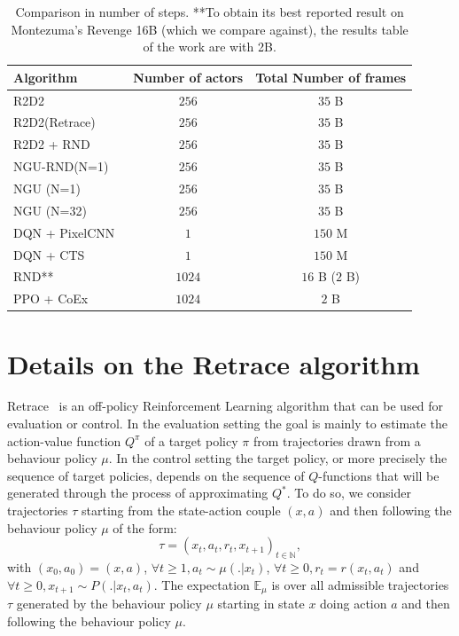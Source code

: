 \documentclass{article} %
\begin{document}
\begin{table}
\begin{tabular}{l|cc}
Algorithm & Number of actors & Total Number of frames  \\ \hline
R2D2~\cite{r2d2}  & $256$ & $35$ B \\
R2D2(Retrace)  & $256$ & $35$ B \\
R2D2 + RND  & $256$ & $35$ B \\
NGU-RND(N=1)  & $256$ & $35$ B \\
NGU (N=1)  & $256$ & $35$ B \\
NGU (N=32)  & $256$ & $35$ B \\
DQN + PixelCNN~\cite{ostrovski2017count} & $1$ & $150$ M \\
DQN + CTS~\cite{bellemare2016unifying} & $1$ & $150$ M \\
RND**~\cite{burda2018exploration}  & $1024$ & $16$ B ($2$  B) \\
PPO + CoEx~\cite{choi2018contingency}  & $1024$ & $2$ B \\
\end{tabular}

\caption{Comparison in number of steps.\newline
 **To obtain its best reported result on Montezuma's Revenge 16B (which we compare against), the results table of the work are with 2B.}
\label{table_computation_comparison}
\vspace{-2ex}
\end{table}

\section{Details on the Retrace algorithm}
\label{app:retrace}
Retrace~\citep{munos2016safe} is an off-policy Reinforcement Learning algorithm that can be used for evaluation or control. In the evaluation setting the goal is mainly to estimate the action-value function $Q^\pi$ of a target policy $\pi$ from trajectories drawn from a behaviour policy $\mu$. In the control setting the target policy, or more precisely the sequence of target policies, depends on the sequence of $Q$-functions that will be generated through the process of approximating $Q^*$. To do so, we consider trajectories $\tau$ starting from the state-action couple $(x, a)$ and then following the behaviour policy $\mu$ of the form:
\begin{equation}
    \tau = \left(x_t, a_t, r_t, x_{t+1}\right)_{t\in\mathbb{N}},
\end{equation}
with $(x_0, a_0) = (x, a)$,  $\forall t\geq1, a_t\sim\mu(.|x_t)$, $\forall t\geq0, r_t=r(x_t, a_t)$ and $\forall t\geq0, x_{t+1}\sim P(.|x_t, a_t)$. The expectation $\mathbb{E}_{\mu}$ is over all admissible trajectories $\tau$ generated by the behaviour policy $\mu$ starting in state $x$ doing action $a$ and then following the behaviour policy $\mu$.
\end{document}
